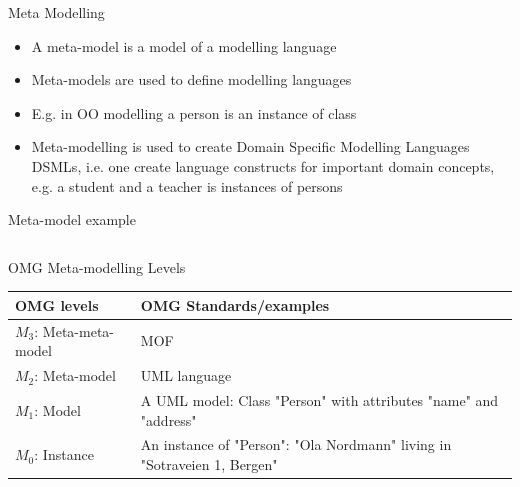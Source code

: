 \documentclass[slidetop,mathserif,red]{beamer}
\begin{document}
\begin{frame}{Meta Modelling}
    \begin{itemize}
    \item A meta-model is a model of a modelling language 

    \item Meta-models are used to define modelling languages

    \item E.g. in OO modelling a person is an instance of class

    \item Meta-modelling is used to create Domain Specific Modelling Languages DSMLs, i.e. one create language constructs for important domain concepts, e.g. a student and a teacher is instances of persons
    \end{itemize}
\end{frame}

\begin{frame}[t]{Meta-model example}
  \begin{columns}[T]

    
  \end{columns}
  \begin{block}{}
  \end{block}
\end{frame}



\begin{frame}{OMG Meta-modelling Levels}
    \begin{center}
  \begin{tabular}{|l|p{60mm}|}
    \hline
    \textbf{OMG levels} & \textbf{OMG Standards/examples}\\ \hline
    $M_3$: Meta-meta-model & MOF\\ \hline
    $M_2$: Meta-model & UML language\\ \hline
    $M_1$: Model & A UML model: Class "Person" with attributes "name" and "address"\\ \hline
    $M_0$: Instance & An instance of "Person": "Ola Nordmann" living in "Sotraveien 1, Bergen"\\ \hline
  \end{tabular}
    \end{center}
\end{frame}
\end{document}
